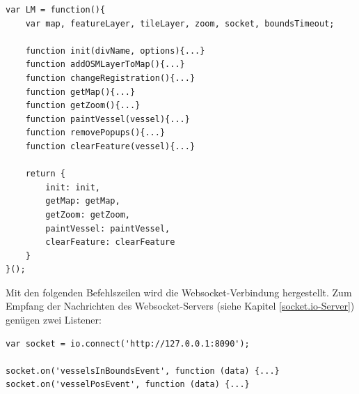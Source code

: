 \begin{lstlisting}[caption= ‘Revealing Module Pattern’ in LeafletMap.js, label=LeafletMap.js]
var LM = function(){
    var map, featureLayer, tileLayer, zoom, socket, boundsTimeout;
	
    function init(divName, options){...}
    function addOSMLayerToMap(){...}
    function changeRegistration(){...}
    function getMap(){...}
    function getZoom(){...}
    function paintVessel(vessel){...}
    function removePopups(){...}
    function clearFeature(vessel){...}
    
    return {
        init: init,
        getMap: getMap,
        getZoom: getZoom,
        paintVessel: paintVessel,
        clearFeature: clearFeature
    }
}();
\end{lstlisting}

Mit den folgenden Befehlszeilen wird die Websocket-Verbindung hergestellt. Zum Empfang der Nachrichten des Websocket-Servers (siehe Kapitel \ref{socket.io-Server}) genügen zwei Listener: 
\begin{lstlisting}[caption=Client-Seite der socket.io-Websocket-Verbindung in ais-socket.io.js,  label=ais-socket.io.js]
var socket = io.connect('http://127.0.0.1:8090');

socket.on('vesselsInBoundsEvent', function (data) {...}
socket.on('vesselPosEvent', function (data) {...}
\end{lstlisting}

